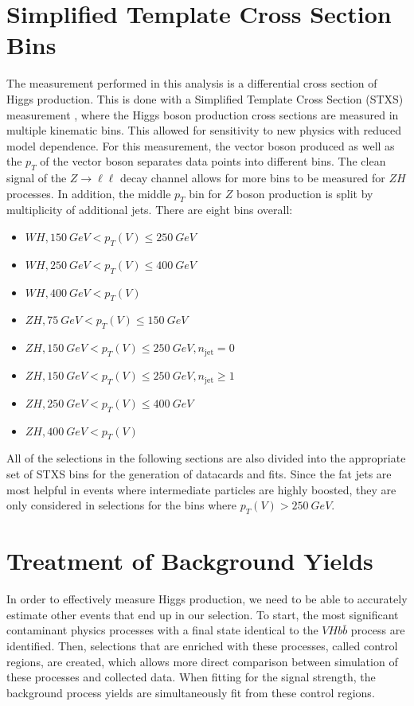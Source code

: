 \section{Simplified Template Cross Section Bins}

The measurement performed in this analysis is a differential
cross section of Higgs production.
This is done with a Simplified Template Cross Section (STXS) measurement \cite{Kato:2687920},
where the Higgs boson production cross sections are measured in multiple kinematic bins.
This allowed for sensitivity to new physics with reduced model dependence.
For this measurement, the vector boson produced as well as the $p_T$ of the vector boson
separates data points into different bins.
The clean signal of the $Z\rightarrow\ell\ell$ decay channel allows for more
bins to be measured for $ZH$ processes.
In addition, the middle $p_T$ bin for $Z$ boson production is split by multiplicity
of additional jets.
There are eight bins overall:
\begin{itemize}
\item $WH, \SI{150}{GeV} < p_T(V) \le \SI{250}{GeV}$
\item $WH, \SI{250}{GeV} < p_T(V) \le \SI{400}{GeV}$
\item $WH, \SI{400}{GeV} < p_T(V)$
\item $ZH, \SI{75}{GeV} < p_T(V) \le \SI{150}{GeV}$
\item $ZH, \SI{150}{GeV} < p_T(V) \le \SI{250}{GeV}, n_\mathrm{jet} = 0$
\item $ZH, \SI{150}{GeV} < p_T(V) \le \SI{250}{GeV}, n_\mathrm{jet} \ge 1$
\item $ZH, \SI{250}{GeV} < p_T(V) \le \SI{400}{GeV}$
\item $ZH, \SI{400}{GeV} < p_T(V)$
\end{itemize}
All of the selections in the following sections are also divided into the appropriate
set of STXS bins for the generation of datacards and fits.
Since the fat jets are most helpful in events where
intermediate particles are highly boosted,
they are only considered in selections for the bins where $p_T(V) > \SI{250}{GeV}$.

\section{Treatment of Background Yields}

In order to effectively measure Higgs production,
we need to be able to accurately estimate other events
that end up in our selection.
To start, the most significant contaminant physics processes with a final state
identical to the $V\!Hb\bar{b}$ process are identified.
Then, selections that are enriched with these processes, called control regions, are created,
which allows more direct comparison between simulation of these processes and collected data.
When fitting for the signal strength, the background process yields are simultaneously fit
from these control regions.

